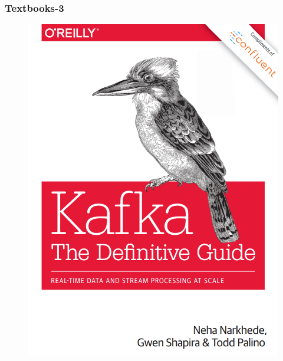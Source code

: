 \begin{frame}[c]
\begin{figure}[ht]
\end{figure}
\end{frame}

\begin{frame}[c]
	\frametitle{Textbooks-3}
	
	\begin{figure}[ht]
		\begin{minipage}[c][1\width]{0.3\textwidth}
			\centering
			\includegraphics[width=.9\linewidth,height=.7\textheight]{./Figures/chapter-00/kafka-tdg.png}
		\end{minipage}
		\hfill	
		\begin{minipage}[c][1\width]{0.3\textwidth}
			\centering

\end{minipage}
\end{figure}
\end{frame}
